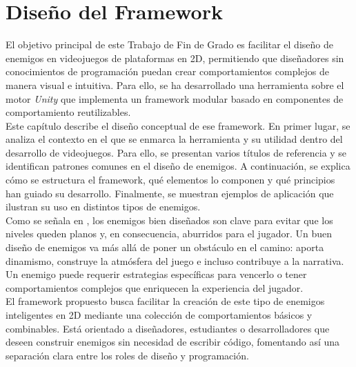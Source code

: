 
\chapter{Diseño del Framework}
\label{cap:descripcionTrabajo}



El objetivo principal de este Trabajo de Fin de Grado es facilitar el diseño de enemigos en videojuegos de plataformas en 2D, permitiendo que diseñadores sin conocimientos de programación puedan crear comportamientos complejos de manera visual e intuitiva. Para ello, se ha desarrollado una herramienta sobre el motor \textit{Unity} que implementa un framework modular basado en componentes de comportamiento reutilizables.\\

Este capítulo describe el diseño conceptual de ese framework. En primer lugar, se analiza el contexto en el que se enmarca la herramienta y su utilidad dentro del desarrollo de videojuegos. Para ello, se presentan varios títulos de referencia y se identifican patrones comunes en el diseño de enemigos. A continuación, se explica cómo se estructura el framework, qué elementos lo componen y qué principios han guiado su desarrollo. Finalmente, se muestran ejemplos de aplicación que ilustran su uso en distintos tipos de enemigos.\\

Como se señala en \citet{Build_a_Bad_Guy_Workshop}, los enemigos bien diseñados son clave para evitar que los niveles queden planos y, en consecuencia, aburridos para el jugador. Un buen diseño de enemigos va más allá de poner un obstáculo en el camino: aporta dinamismo, construye la atmósfera del juego e incluso contribuye a la narrativa. Un enemigo puede requerir estrategias específicas para vencerlo o tener comportamientos complejos que enriquecen la experiencia del jugador.\\

El framework propuesto busca facilitar la creación de este tipo de enemigos inteligentes en 2D mediante una colección de comportamientos básicos y combinables. Está orientado a diseñadores, estudiantes o desarrolladores que deseen construir enemigos sin necesidad de escribir código, fomentando así una separación clara entre los roles de diseño y programación.\\


